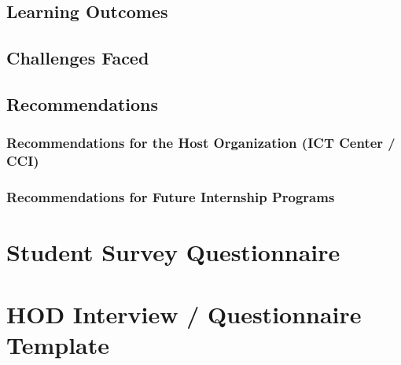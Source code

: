 ﻿\documentclass[12pt, a4paper]{article}
\begin{document}
\subsection{Learning Outcomes}



\subsection{Challenges Faced}



\subsection{Recommendations}

\subsubsection*{Recommendations for the Host Organization (ICT Center / CCI)}



\subsubsection*{Recommendations for Future Internship Programs}



\clearpage

\appendix
\renewcommand{\thesection}{\Alph{section}}

\section{Student Survey Questionnaire}
\label{appendix:survey}



\section{HOD Interview / Questionnaire Template}
\label{appendix:hod}
\end{document}
